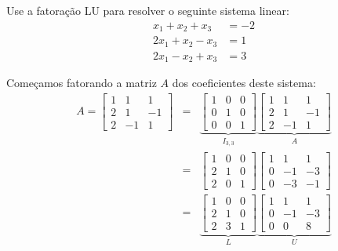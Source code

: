 \begin{ex}
  Use a fatoração LU para resolver o seguinte sistema linear:
  \begin{equation}
    \begin{split}
      x_1 + x_2 + x_3 &= -2\\
      2x_1 + x_2 - x_3 &= 1\\
      2x_1 -x_2 + x_3 &= 3
    \end{split}
  \end{equation}
\end{ex}
\begin{sol}
Começamos fatorando a matriz $A$ dos coeficientes deste sistema:
\begin{eqnarray}
      A =
    \begin{bmatrix}
      1 & 1 & 1\\
      2 & 1 & -1\\
      2 & -1 & 1
    \end{bmatrix}
    &=&
     \underbrace{\begin{bmatrix}
      1 & 0 & 0\\
      0 & 1 & 0\\
      0 & 0 & 1
    \end{bmatrix}}_{I_{3,3}}
    \underbrace{\begin{bmatrix}
      1 & 1 & 1\\
      2 & 1 & -1\\
      2 & -1 & 1
    \end{bmatrix}}_{A}\\
  &=&
    \begin{bmatrix}
      1 & 0 & 0\\
      2 & 1 & 0\\
      2 & 0 & 1
    \end{bmatrix}
    \begin{bmatrix}
      1 & 1 & 1\\
      0 & -1 & -3\\
      0 & -3 & -1
    \end{bmatrix}\\
  &=&
    \underbrace{\begin{bmatrix}
      1 & 0 & 0\\
      2 & 1 & 0\\
      2 & 3 & 1
    \end{bmatrix}}_{L}
    \underbrace{\begin{bmatrix}
      1 & 1 & 1\\
      0 & -1 & -3\\
      0 & 0 & 8
    \end{bmatrix}}_{U}\\
\end{eqnarray}


\end{sol}
